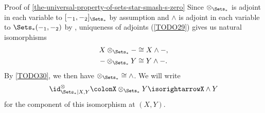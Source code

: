 \begin{Proof}{Proof of \cref{the-universal-property-of-sets-star-smash-s-zero}}
    Since $\otimes_{\Sets_{*}}$ is adjoint in each variable to $[-_{1},-_{2}]_{\Sets_{*}}$ by assumption and $\wedge$ is adjoint in each variable to $\Sets_{*}(-_{1},-_{2})$ by , uniqueness of adjoints (\cref{TODO29}) gives us natural isomorphisms
    \begin{align*}
        X\otimes_{\Sets_{*}}- &\cong X\wedge-,\\
        -\otimes_{\Sets_{*}}Y &\cong Y\wedge-.
    \end{align*}
    By \cref{TODO30}, we then have $\mathord{\otimes_{\Sets_{*}}}\cong\mathord{\wedge}$. We will write
    \[
        \id^{\otimes}_{\Sets_{*}|X,Y}%
        \colon%
        X\otimes_{\Sets_{*}}Y%
        \isorightarrow%
        X\wedge Y%
    \]%
    for the component of this isomorphism at $(X,Y)$.


\end{Proof}
